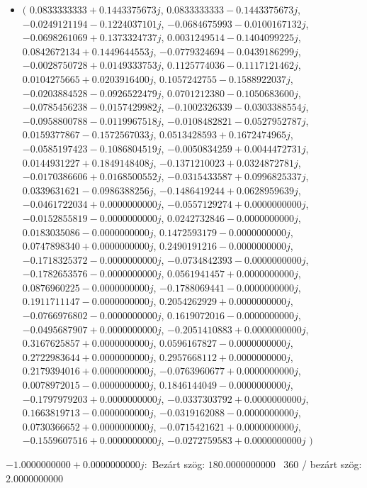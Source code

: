 \documentclass[14pt,a4paper]{article}
\begin{document}
\begin{itemize}
\item
$\big($
$0.0833333333+0.1443375673j$, $0.0833333333-0.1443375673j$, $-0.0249121194-0.1224037101j$, $-0.0684675993-0.0100167132j$, $-0.0698261069+0.1373324737j$, $0.0031249514-0.1404099225j$, $0.0842672134+0.1449644553j$, $-0.0779324694-0.0439186299j$, $-0.0028750728+0.0149333753j$, $0.1125774036-0.1117121462j$, $0.0104275665+0.0203916400j$, $0.1057242755-0.1588922037j$, $-0.0203884528-0.0926522479j$, $0.0701212380-0.1050683600j$, $-0.0785456238-0.0157429982j$, $-0.1002326339-0.0303388554j$, $-0.0958800788-0.0119967518j$, $-0.0108482821-0.0527952787j$, $0.0159377867-0.1572567033j$, $0.0513428593+0.1672474965j$, $-0.0585197423-0.1086804519j$, $-0.0050834259+0.0044472731j$, $0.0144931227+0.1849148408j$, $-0.1371210023+0.0324872781j$, $-0.0170386606+0.0168500552j$, $-0.0315433587+0.0996825337j$, $0.0339631621-0.0986388256j$, $-0.1486419244+0.0628959639j$, $-0.0461722034+0.0000000000j$, $-0.0557129274+0.0000000000j$, $-0.0152855819-0.0000000000j$, $0.0242732846-0.0000000000j$, $0.0183035086-0.0000000000j$, $0.1472593179-0.0000000000j$, $0.0747898340+0.0000000000j$, $0.2490191216-0.0000000000j$, $-0.1718325372-0.0000000000j$, $-0.0734842393-0.0000000000j$, $-0.1782653576-0.0000000000j$, $0.0561941457+0.0000000000j$, $0.0876960225-0.0000000000j$, $-0.1788069441-0.0000000000j$, $0.1911711147-0.0000000000j$, $0.2054262929+0.0000000000j$, $-0.0766976802-0.0000000000j$, $0.1619072016-0.0000000000j$, $-0.0495687907+0.0000000000j$, $-0.2051410883+0.0000000000j$, $0.3167625857+0.0000000000j$, $0.0596167827-0.0000000000j$, $0.2722983644+0.0000000000j$, $0.2957668112+0.0000000000j$, $0.2179394016+0.0000000000j$, $-0.0763960677+0.0000000000j$, $0.0078972015-0.0000000000j$, $0.1846144049-0.0000000000j$, $-0.1797979203+0.0000000000j$, $-0.0337303792+0.0000000000j$, $0.1663819713-0.0000000000j$, $-0.0319162088-0.0000000000j$, $0.0730366652+0.0000000000j$, $-0.0715421621+0.0000000000j$, $-0.1559607516+0.0000000000j$, $-0.0272759583+0.0000000000j$
$\big)$
\end{itemize}
$-1.0000000000+0.0000000000j$:\
Bezárt szög: $180.0000000000$ \
360 / bezárt szög: $2.0000000000$\
\end{document}
